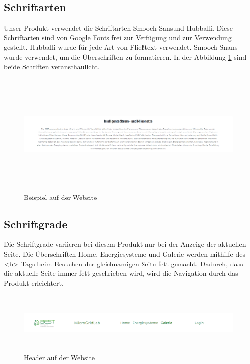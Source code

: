 \subsection{Schriftarten}
Unser Produkt verwendet die Schriftarten \glqq Smooch Sans\grqq und \glqq Hubballi\grqq. Diese Schriftarten sind von Google Fonts frei zur Verfügung und zur Verwendung gestellt. Hubballi wurde für jede Art von Fließtext verwendet. Smooch Snans wurde verwendet, um die Überschriften zu formatieren. In der Abbildung \ref{fig: Beispiel auf der Website} sind beide Schriften veranschaulicht.
\begin{figure}[h]
	\centering
	\includegraphics[height=6cm,width=15cm]{images/Beispiel_Schriftarten}
	\caption{Beispiel auf der Website}
	\label{fig: Beispiel auf der Website}
\end{figure}
\newpage
\subsection{Schriftgrade}
Die Schriftgrade variieren bei diesem Produkt nur bei der Anzeige der aktuellen Seite.
Die Überschriften Home, Energiesysteme und Galerie werden mithilfe des <b> Tags beim Besuchen der gleichnamigen Seite fett gemacht. Dadurch, dass die aktuelle Seite immer fett geschrieben wird, wird die Navigation durch das Produkt erleichtert.
\begin{figure}[h]
	\centering
	\includegraphics[height=3cm,width=20cm]{images/Header}
	\caption{Header auf der Website}
	\label{fig: Header}
\end{figure}

